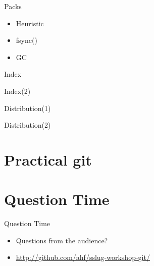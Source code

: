 \documentclass[xcolor=pdftex,dvipsnames]{beamer}
\begin{document}
\begin{frame}{Packs}
  \begin{itemize}
  \item Heuristic
  \item fsync()
  \item GC
  \end{itemize}
\end{frame}
\begin{frame}{Index}\end{frame}
\begin{frame}{Index(2)}\end{frame}
\begin{frame}{Distribution(1)}\end{frame}
\begin{frame}{Distribution(2)}\end{frame}

\section{Practical git}

\section{Question Time}
\begin{frame}{Question Time}
    \begin{itemize}
        \item Questions from the audience?
        \item \url{http://github.com/ahf/sslug-workshop-git/}
    \end{itemize}
\end{frame}
\end{document}
